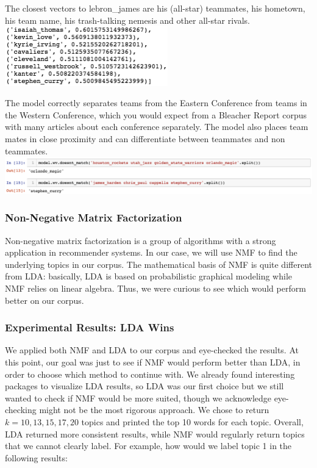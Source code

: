 \documentclass[11pt]{article}
\begin{document}
The closest vectors to lebron\_james are his (all-star) teammates, his hometown, his team name, his trash-talking nemesis and other all-star rivals. \\
\includegraphics[width=200pt]{james_word2vec.png} 

The model correctly separates teams from the Eastern Conference from teams in the Western Conference, which you would expect from a Bleacher Report corpus with many articles about each conference separately. The model also places team mates in close proximity and can differentiate between teammates and non teammates. \\
\includegraphics[width=450pt]{word2vec_diffs.png} 

\subsubsection{Non-Negative Matrix Factorization}

Non-negative matrix factorization is a group of algorithms with a strong application in recommender
systems. In our case, we will use NMF to find the underlying topics in our corpus. The mathematical
basis of NMF is quite different from LDA: basically, LDA is based on probabilistic graphical modeling
while NMF relies on linear algebra. Thus, we were curious to see which would perform better on
our corpus.

\subsubsection{Experimental Results: LDA Wins}
We applied both NMF and LDA to our corpus and eye-checked the results. At this point, our goal
was just to see if NMF would perform better than LDA, in order to choose which method to
continue with. We already found interesting packages to visualize LDA results, so
LDA was our first choice but we still wanted to check if NMF would be more suited,
though we acknowledge eye-checking might not be the most rigorous approach.
We chose to return $k=10, 13, 15, 17, 20$ topics and printed the top 10 words for each topic.
Overall, LDA returned more consistent results, while NMF would regularly return topics that 
we cannot clearly label. For example, how would we label topic 1 in the following results:
\end{document}
